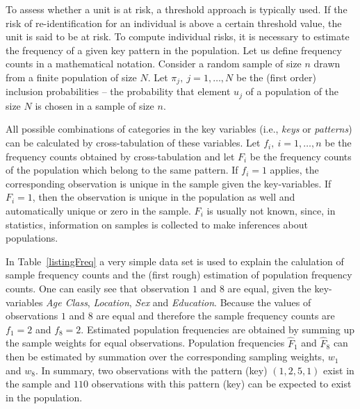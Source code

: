 \documentclass[12pt]{scrartcl}\usepackage[]{graphicx}\usepackage[]{color}
\begin{document}
To assess whether a unit is at risk, a threshold approach is typically used. If the risk of re-identification for an individual is above a certain threshold value, the unit is said to be at risk. To compute individual risks, it is necessary to estimate the frequency of a given key pattern in the population. Let us define frequency counts in a mathematical notation. Consider a random sample of size $n$ drawn from a finite population of size $N$. Let $\pi_{j}, \ j = 1, \ldots, N$ be the (first order) inclusion probabilities -- the probability that element $u_j$ of a population of the size $N$ is chosen in a sample of size $n$.

All possible combinations of categories in the key variables (i.e., \textit{keys} or \textit{patterns}) can be calculated by cross-tabulation of these variables. Let $f_i, \ i=1,\ldots,n$ be the frequency counts obtained by cross-tabulation and let $F_i$ be the frequency counts of the population which belong to the same pattern. If $f_i = 1$ applies, the corresponding observation is unique in the sample given the key-variables. If $F_i = 1$, then the observation is unique in the population as well and automatically unique or zero in the sample. $F_i$ is usually not known, since, in statistics, information on samples is collected to make inferences about populations.

In Table~\ref{listingFreq} a very simple data set is used to explain the calulation of sample frequency counts and the (first rough) estimation of population frequency counts. One can easily see that observation $1$ and $8$ are equal, given the key-variables \textit{Age Class}, \textit{Location}, \textit{Sex} and \textit{Education}. Because the values of observations $1$ and $8$ are equal and therefore the sample frequency counts are $f_1=2$ and $f_8=2$. Estimated population frequencies are obtained by summing up the sample weights for equal observations. Population frequencies  $\hat{F}_1$ and $\hat{F}_8$ can then be estimated by summation over the corresponding sampling weights, $w_1$ and $w_8$. In summary, two observations with the pattern (key) $(1,2,5,1)$ exist in the sample and $110$ observations with this pattern (key) can be expected to exist in the population.
\end{document}
